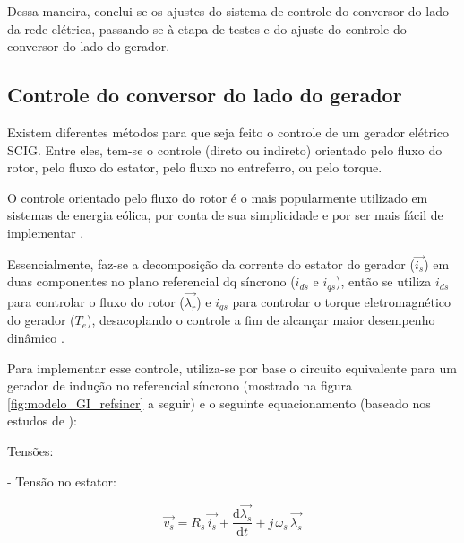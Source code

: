 








Dessa maneira, conclui-se os ajustes do sistema de controle do conversor do lado da rede elétrica, passando-se à etapa de testes e do ajuste do controle do conversor do lado do gerador.



\subsection{Controle do conversor do lado do gerador}

Existem diferentes métodos para que seja feito o controle de um gerador elétrico \ac{SCIG}. Entre eles, tem-se o controle (direto ou indireto) orientado pelo fluxo do rotor, pelo fluxo do estator, pelo fluxo no entreferro, ou pelo torque.

O controle orientado pelo fluxo do rotor é o mais popularmente utilizado em sistemas de energia eólica, por conta de sua simplicidade e por ser mais fácil de implementar \cite{wu2011power}.

Essencialmente, faz-se a decomposição da corrente do estator do gerador ($\vec{i_s}$) em duas componentes no plano referencial dq síncrono ($ i_{ds} $ e $ i_{qs} $), então se utiliza $ i_{ds} $ para controlar o fluxo do rotor ($ \vec{\lambda_r} $) e $ i_{qs} $ para controlar o torque eletromagnético do gerador ($ T_e $), desacoplando o controle a fim de alcançar maior desempenho dinâmico \cite{wu2011power}.

Para implementar esse controle, utiliza-se por base o circuito equivalente para um gerador de indução no referencial síncrono (mostrado na figura \ref{fig:modelo_GI_refsincr} a seguir) e o seguinte equacionamento (baseado nos estudos de ):

Tensões:

- Tensão no estator:

\begin{equation}
\label{eq:vstator_gi}
 \vec{v_{s}} = R_s\,\vec{i_{s}} + \frac{\mathrm{d} \vec{\lambda_{s}}}{\mathrm{d} t} + j\,\omega_s\,\vec{\lambda_{s}} 
\end{equation}

